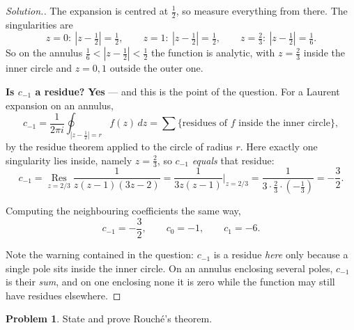 \documentclass[11pt,a4paper]{article}
\theoremstyle{definition}
\newtheorem{problemx}{Problem}[section]
\newenvironment{problem}{\begin{problemx}}{\end{problemx}}
\newenvironment{solution}
  {\renewcommand{\qedsymbol}{}\begin{proof}[\textit{Solution}.]}
  {\end{proof}}
\begin{document}
\begin{solution}
The expansion is centred at $\tfrac12$, so measure everything from there. The
singularities are
$$z = 0:\ \left|z-\tfrac12\right| = \tfrac12,\qquad
z = 1:\ \left|z-\tfrac12\right| = \tfrac12,\qquad
z = \tfrac23:\ \left|z-\tfrac12\right| = \tfrac16 .$$
So on the annulus $\tfrac16 < \left|z-\tfrac12\right| < \tfrac12$ the function is
analytic, with $z = \tfrac23$ inside the inner circle and $z = 0, 1$ outside the
outer one.

\textbf{Is $c_{-1}$ a residue?} \textbf{Yes} --- and this is the point of the
question. For a Laurent expansion on an annulus,
$$c_{-1} = \frac{1}{2\pi i}\oint_{\left|z-\frac12\right| = r} f(z)\,dz
= \sum \Big\{\text{residues of } f \text{ inside the inner circle}\Big\},$$
by the residue theorem applied to the circle of radius $r$. Here exactly one
singularity lies inside, namely $z = \tfrac23$, so $c_{-1}$ \emph{equals} that
residue:
$$c_{-1} = \operatorname*{Res}_{z=2/3}\frac{1}{z(z-1)(3z-2)}
= \frac{1}{3z(z-1)}\bigg|_{z=2/3}
= \frac{1}{3\cdot\frac23\cdot\left(-\frac13\right)} = -\frac{3}{2}.$$

Computing the neighbouring coefficients the same way,
$$\boxed{c_{-1} = -\frac{3}{2},\qquad c_{0} = -1,\qquad c_{1} = -6 .}$$

Note the warning contained in the question: $c_{-1}$ is a residue \emph{here}
only because a single pole sits inside the inner circle. On an annulus enclosing
several poles, $c_{-1}$ is their \emph{sum}, and on one enclosing none it is zero
while the function may still have residues elsewhere.
\end{solution}


\begin{problem}
State and prove Rouch\'e's theorem.
\end{problem}
\end{document}
